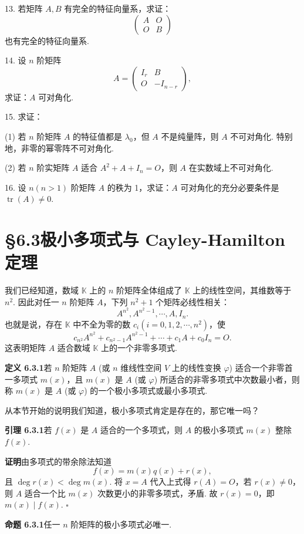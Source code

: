 \documentclass[UTF8,12pt,a4paper,fontset=fandol]{ctexart}
\begin{document}
13. 若矩阵 $A,B$ 有完全的特征向量系，求证：
\[
\left(\begin{array}{cc}
A & O\\
O & B
\end{array}\right)
\]
也有完全的特征向量系.

14. 设 $n$ 阶矩阵
\[
A=\left(\begin{array}{cc}
I_r & B\\
O & -I_{n-r}
\end{array}\right),
\]
求证：$A$ 可对角化.

15. 求证：

(1) 若 $n$ 阶矩阵 $A$ 的特征值都是 $\lambda_0$，但 $A$ 不是纯量阵，则 $A$ 不可对角化. 特别地，非零的幂零阵不可对角化.

(2) 若 $n$ 阶实矩阵 $A$ 适合 $A^2+A+I_n=O$，则 $A$ 在实数域上不可对角化.

16. 设 $n(n>1)$ 阶矩阵 $A$ 的秩为 1，求证：$A$ 可对角化的充分必要条件是 $\operatorname{tr}(A)\neq 0$.

\section*{§6.3\quad 极小多项式与 Cayley-Hamilton 定理}

我们已经知道，数域 $\mathbb{K}$ 上的 $n$ 阶矩阵全体组成了 $\mathbb{K}$ 上的线性空间，其维数等于 $n^2$. 因此对任一 $n$ 阶矩阵 $A$，下列 $n^2+1$ 个矩阵必线性相关：
\[
A^{n^2},A^{n^2-1},\cdots,A,I_n.
\]
也就是说，存在 $\mathbb{K}$ 中不全为零的数 $c_i(i=0,1,2,\cdots,n^2)$，使
\[
c_{n^2}A^{n^2}+c_{n^2-1}A^{n^2-1}+\cdots+c_1A+c_0I_n=O.
\]
这表明矩阵 $A$ 适合数域 $\mathbb{K}$ 上的一个非零多项式.

\noindent\textbf{定义 6.3.1}\quad 若 $n$ 阶矩阵 $A$ (或 $n$ 维线性空间 $V$ 上的线性变换 $\varphi$) 适合一个非零首一多项式 $m(x)$，且 $m(x)$ 是 $A$ (或 $\varphi$) 所适合的非零多项式中次数最小者，则称 $m(x)$ 是 $A$ (或 $\varphi$) 的一个极小多项式或最小多项式.

从本节开始的说明我们知道，极小多项式肯定是存在的，那它唯一吗？

\noindent\textbf{引理 6.3.1}\quad 若 $f(x)$ 是 $A$ 适合的一个多项式，则 $A$ 的极小多项式 $m(x)$ 整除 $f(x)$.

\noindent\textbf{证明}\quad 由多项式的带余除法知道
\[
f(x)=m(x)q(x)+r(x),
\]
且 $\deg r(x)<\deg m(x)$. 将 $x=A$ 代入上式得 $r(A)=O$，若 $r(x)\neq 0$，则 $A$ 适合一个比 $m(x)$ 次数更小的非零多项式，矛盾. 故 $r(x)=0$，即 $m(x)\mid f(x)$. $\square$

\noindent\textbf{命题 6.3.1}\quad 任一 $n$ 阶矩阵的极小多项式必唯一.
\end{document}

